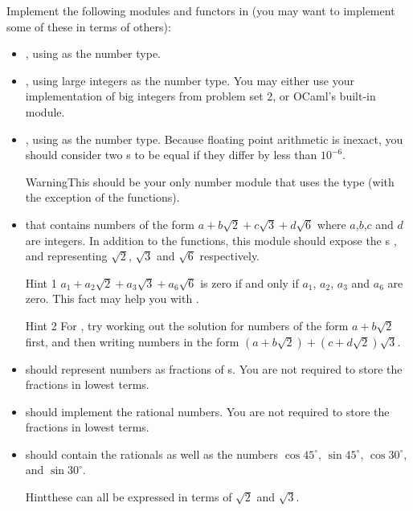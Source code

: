 \documentclass{pset}
\begin{document}
Implement the following modules and functors in  (you may
want to implement some of these in terms of others):
\begin{itemize}
\item {}, using  as the number type.
\item {}, using large integers as the number type.
      You may either use your implementation of big integers from problem set 2,
      or OCaml's built-in  module.
\item {}, using  as the number type.
      Because floating point arithmetic is inexact, you should consider two
      s to be equal if they differ by less than $10^{-6}$.
      \begin{note}{Warning}This should be your only number module that uses the  type (with the exception of the  functions).\end{note}
\item {} that contains numbers of the form
      $a + b\sqrt{2} + c\sqrt{3} + d\sqrt{6}$ where $a$,$b$,$c$ and $d$ are
      integers.  In addition to the  functions, this module
      should expose the s , 
      and  representing $\sqrt{2}$, $\sqrt{3}$ and $\sqrt{6}$
      respectively.
      \begin{note}{Hint 1} $a_1 + a_2\sqrt{2} + a_3\sqrt{3} + a_6\sqrt{6}$ is
      zero if and only if $a_1$, $a_2$, $a_3$ and $a_6$ are zero.  This fact may
      help you with .
      \end{note}
      \begin{note}{Hint 2} For , try working out the
      solution for numbers of the form $a + b\sqrt{2}$ first, and then writing
      numbers in the form $(a + b\sqrt{2}) + (c + d\sqrt{2})\sqrt{3}$.
      \end{note}
\item {} should
      represent numbers as fractions of s.  You are not required
      to store the fractions in lowest terms.
\item {} should implement the rational numbers.
      You are not required to store the fractions in lowest terms.
\item {} should contain the rationals as well as
      the numbers $\cos 45^\circ$, $\sin 45^\circ$, $\cos 30^\circ$, and
      $\sin 30^\circ$.
\begin{note}{Hint}these can all be expressed in terms of $\sqrt{2}$ and $\sqrt{3}$.\end{note}
\end{itemize}
\end{document}
